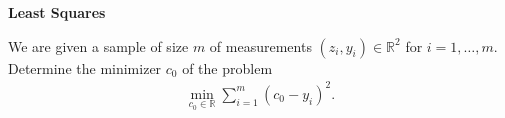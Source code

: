 \textbf{\normalsize Least Squares}

We are given a sample of size $m$ of measurements $(z_i,y_i)\in\mathbb{R}^2$ for $i=1,\dots,m$. 
Determine the minimizer $c_0$ of the problem
\begin{align*}
\min \limits_{c_0\in\mathbb{R}} \sum_{i=1}^m (c_0 - y_i)^2.
\end{align*}


